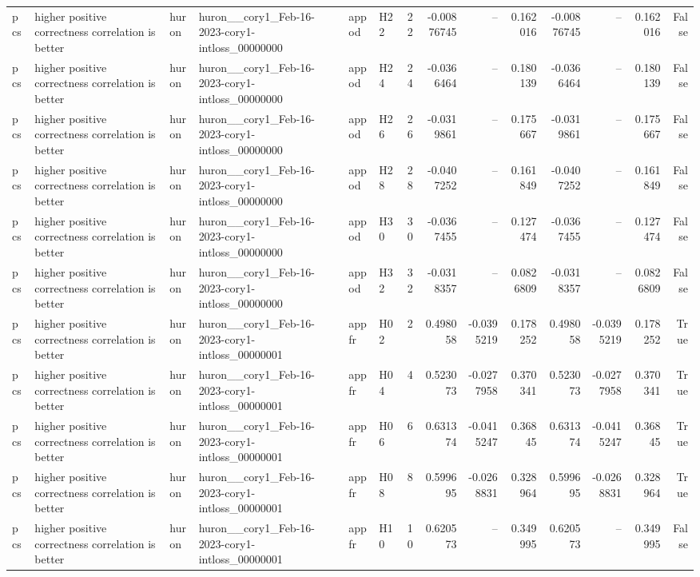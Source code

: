 \begin{longtable}{llllllrrrrrrrr}
pcs & higher positive correctness correlation is better & huron & huron\_\_cory1\_Feb-16-2023-cory1-intloss\_00000000 & appod & H22 & 22 & -0.00876745 & -- & 0.162016 & -0.00876745 & -- & 0.162016 & False \\
pcs & higher positive correctness correlation is better & huron & huron\_\_cory1\_Feb-16-2023-cory1-intloss\_00000000 & appod & H24 & 24 & -0.0366464 & -- & 0.180139 & -0.0366464 & -- & 0.180139 & False \\
pcs & higher positive correctness correlation is better & huron & huron\_\_cory1\_Feb-16-2023-cory1-intloss\_00000000 & appod & H26 & 26 & -0.0319861 & -- & 0.175667 & -0.0319861 & -- & 0.175667 & False \\
pcs & higher positive correctness correlation is better & huron & huron\_\_cory1\_Feb-16-2023-cory1-intloss\_00000000 & appod & H28 & 28 & -0.0407252 & -- & 0.161849 & -0.0407252 & -- & 0.161849 & False \\
pcs & higher positive correctness correlation is better & huron & huron\_\_cory1\_Feb-16-2023-cory1-intloss\_00000000 & appod & H30 & 30 & -0.0367455 & -- & 0.127474 & -0.0367455 & -- & 0.127474 & False \\
pcs & higher positive correctness correlation is better & huron & huron\_\_cory1\_Feb-16-2023-cory1-intloss\_00000000 & appod & H32 & 32 & -0.0318357 & -- & 0.0826809 & -0.0318357 & -- & 0.0826809 & False \\
pcs & higher positive correctness correlation is better & huron & huron\_\_cory1\_Feb-16-2023-cory1-intloss\_00000001 & appfr & H02 & 2 & 0.498058 & -0.0395219 & 0.178252 & 0.498058 & -0.0395219 & 0.178252 & True \\
pcs & higher positive correctness correlation is better & huron & huron\_\_cory1\_Feb-16-2023-cory1-intloss\_00000001 & appfr & H04 & 4 & 0.523073 & -0.0277958 & 0.370341 & 0.523073 & -0.0277958 & 0.370341 & True \\
pcs & higher positive correctness correlation is better & huron & huron\_\_cory1\_Feb-16-2023-cory1-intloss\_00000001 & appfr & H06 & 6 & 0.631374 & -0.0415247 & 0.36845 & 0.631374 & -0.0415247 & 0.36845 & True \\
pcs & higher positive correctness correlation is better & huron & huron\_\_cory1\_Feb-16-2023-cory1-intloss\_00000001 & appfr & H08 & 8 & 0.599695 & -0.0268831 & 0.328964 & 0.599695 & -0.0268831 & 0.328964 & True \\
pcs & higher positive correctness correlation is better & huron & huron\_\_cory1\_Feb-16-2023-cory1-intloss\_00000001 & appfr & H10 & 10 & 0.620573 & -- & 0.349995 & 0.620573 & -- & 0.349995 & False \\

\end{longtable}

